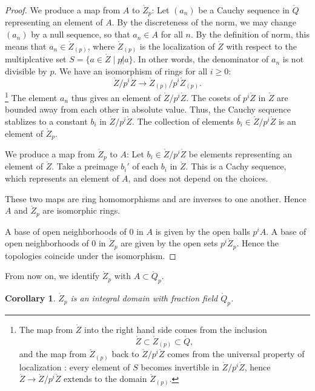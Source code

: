 \documentclass{amsart}
\newtheorem{corollary}[equation]{Corollary}
\begin{document}
\begin{proof}
  We produce a map from $A$ to $\ring{Z}_p$: Let $(a_n)$ be a Cauchy
  sequence in $\ring{Q}$ representing an element of $A$.  By the
  discreteness of the norm, we may change $(a_n)$ by a null sequence,
  so that $a_n\in A$ for all $n$.  By the definition of norm, this
  means that $a_n \in \ring{Z}_{(p)}$, where $\ring{Z}_{(p)}$ is the
  localization of $\ring{Z}$ with respect to the multiplcative set $S
  = \{a\in\ring{Z}\mid p \not| a\}$.  In other words, the denominator
  of $a_n$ is not divisible by $p$.  We have an isomorphism of rings
  for all $i\ge0$:
\[
\ring{Z}/p^i\ring{Z} \to \ring{Z}_{(p)}/p^i\ring{Z}_{(p)}.
\]
\footnote{The map from $\ring{Z}$ into the right hand side comes from the inclusion
\[
\ring{Z}\subset\ring{Z}_{(p)}\subset \ring{Q},
\]
and the map from $\ring{Z}_{(p)}$ back to $\ring{Z}/p^i\ring{Z}$ comes
from the universal property of localization \cite[8.46]{knapp-basic}: 
every element of $S$
becomes invertible in $\ring{Z}/p^i\ring{Z}$, hence
$\ring{Z}\to\ring{Z}/p^i\ring{Z}$ extends to the domain $\ring{Z}_{(p)}$.}
The element $a_n$ thus gives an element of $\ring{Z}/p^i\ring{Z}$.
The cosets of $p^i\ring{Z}$ in $\ring{Z}$ are bounded away from each
other in absolute value.  Thus, the Cauchy sequence stablizes to
a constant $b_i$ in $\ring{Z}/p^i\ring{Z}$.  The collection of
elements $b_i\in\ring{Z}/p^i\ring{Z}$ is an element of $\ring{Z}_p$.

We produce a map from $\ring{Z}_p$ to $A$: Let
$b_i\in\ring{Z}/p^i\ring{Z}$ be elements representing an element of
$\ring{Z}$.  Take a preimage $b_i'$ of each $b_i$ in $\ring{Z}$.  This
is a Cachy sequence, which represents an element of $A$, and does not
depend on the choices.

These two maps are ring homomorphisms and are inverses to one another.
Hence $A$ and $\ring{Z}_p$ are isomorphic rings.

A base of open neighborhoods of $0$ in $A$ is given by the open balls
$p^i A$.  A base of open neighborhoods of $0$ in $\ring{Z}_p$ are
given by the open sets $p^i\ring{Z}_p$.  Hence the topologies coincide
under the isomorphism.
\end{proof}

From now on, we identify $\ring{Z}_p$ with $A\subset\ring{Q}_p$.

\begin{corollary} $\ring{Z}_p$ is an integral domain with fraction field $\ring{Q}_p$.
\end{corollary}
\end{document}
